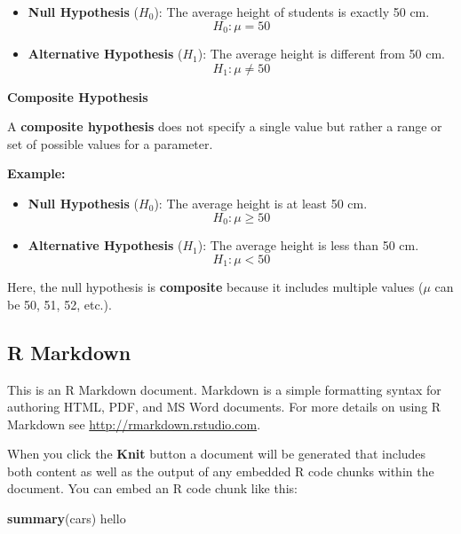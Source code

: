 \documentclass[
]{article}
\newenvironment{Shaded}{\begin{snugshade}}{\end{snugshade}}
\newcommand{\FunctionTok}[1]{\textcolor[rgb]{0.13,0.29,0.53}{\textbf{#1}}}
\newcommand{\NormalTok}[1]{#1}
\begin{document}
\begin{itemize}
\item
  \textbf{Null Hypothesis} (\(H_0\)): The average height of students is
  exactly 50 cm.\\
  \[
  H_0: \mu = 50
  \]
\item
  \textbf{Alternative Hypothesis} (\(H_1\)): The average height is
  different from 50 cm.\\
  \[
  H_1: \mu \neq 50
  \]
\end{itemize}

\textbf{Composite Hypothesis}

A \textbf{composite hypothesis} does not specify a single value but
rather a range or set of possible values for a parameter.

\textbf{Example:}

\begin{itemize}
\item
  \textbf{Null Hypothesis} (\(H_0\)): The average height is at least 50
  cm.\\
  \[
  H_0: \mu \geq 50
  \]
\item
  \textbf{Alternative Hypothesis} (\(H_1\)): The average height is less
  than 50 cm.\\
  \[
  H_1: \mu < 50
  \]
\end{itemize}

Here, the null hypothesis is \textbf{composite} because it includes
multiple values (\(\mu\) can be 50, 51, 52, etc.).

\subsection{R Markdown}\label{r-markdown}

This is an R Markdown document. Markdown is a simple formatting syntax
for authoring HTML, PDF, and MS Word documents. For more details on
using R Markdown see \url{http://rmarkdown.rstudio.com}.

When you click the \textbf{Knit} button a document will be generated
that includes both content as well as the output of any embedded R code
chunks within the document. You can embed an R code chunk like this:

\begin{Shaded}
\begin{Highlighting}[]
\FunctionTok{summary}\NormalTok{(cars)}
\NormalTok{hello}
\end{Highlighting}
\end{Shaded}
\end{document}
